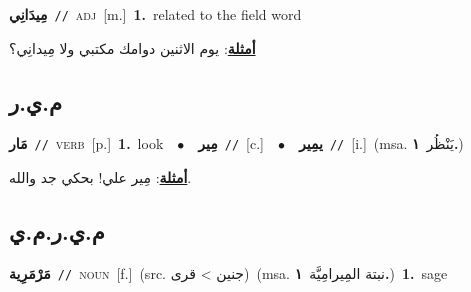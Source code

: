 \documentclass[10pt,a4paper,twoside]{article} %
\begin{document}
\begin{multicols}{2}
{\setlength\topsep{0pt}\textbf{\foreignlanguage{arabic}{مِيدَانِي}}\ {\color{gray}\texttt{//}\color{black}}\ \textsc{adj}\ [m.]\ \textbf{1.}~related to the field word\  \begin{flushright}\color{gray}\foreignlanguage{arabic}{\textbf{\underline{\foreignlanguage{arabic}{أمثلة}}}: يوم الاثنين دوامك مكتبي ولا مِيدانِي؟}\end{flushright}\color{black}} \vspace{2mm}

\vspace{-3mm}
\subsection*{\color{blue}\foreignlanguage{arabic}{م.ي.ر}\color{blue}{}} 

{\setlength\topsep{0pt}\textbf{\foreignlanguage{arabic}{مَار}}\ {\color{gray}\texttt{//}\color{black}}\ \textsc{verb}\ [p.]\ \textbf{1.}~look\ \ $\bullet$\ \ \setlength\topsep{0pt}\textbf{\foreignlanguage{arabic}{مِير}}\ {\color{gray}\texttt{//}\color{black}}\ [c.]\ \ $\bullet$\ \ \setlength\topsep{0pt}\textbf{\foreignlanguage{arabic}{يمِير}}\ {\color{gray}\texttt{//}\color{black}}\ [i.]\ \color{gray}(msa. \foreignlanguage{arabic}{يَنْظُر}~\foreignlanguage{arabic}{\textbf{١.}})\color{black}\  \begin{flushright}\color{gray}\foreignlanguage{arabic}{\textbf{\underline{\foreignlanguage{arabic}{أمثلة}}}: مِير علي! بحكي جد والله.}\end{flushright}\color{black}} \vspace{2mm}

\vspace{-3mm}
\subsection*{\color{blue}\foreignlanguage{arabic}{م.ي.ر.م.ي}\color{blue}{ (ntws)}} 

{\setlength\topsep{0pt}\textbf{\foreignlanguage{arabic}{مَرْمَرِية}}\ {\color{gray}\texttt{//}\color{black}}\ \textsc{noun}\ [f.]\ (src. \color{gray}\foreignlanguage{arabic}{جنين > قرى}\color{black})\ \color{gray}(msa. \foreignlanguage{arabic}{نبتة المِيرامِيَّة}~\foreignlanguage{arabic}{\textbf{١.}})\color{black}\ \textbf{1.}~sage\ } \vspace{2mm}


\end{multicols}
\end{document}
